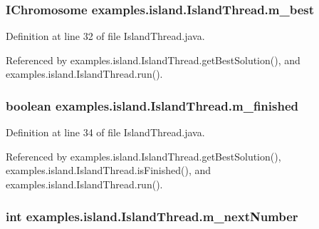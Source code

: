 \hypertarget{classexamples_1_1island_1_1_island_thread_a6bc44da1d0ca531ed0d04d6ccd7b2d6f}{
\subsubsection[{m\-\_\-best}]{\setlength{\rightskip}{0pt plus 5cm}I\-Chromosome examples.\-island.\-Island\-Thread.\-m\-\_\-best\hspace{0.3cm}{\ttfamily [private]}}}\label{classexamples_1_1island_1_1_island_thread_a6bc44da1d0ca531ed0d04d6ccd7b2d6f}


Definition at line 32 of file Island\-Thread.\-java.



Referenced by examples.\-island.\-Island\-Thread.\-get\-Best\-Solution(), and examples.\-island.\-Island\-Thread.\-run().

\hypertarget{classexamples_1_1island_1_1_island_thread_a5c59594d897f6d104fc638f4ee15d4c9}{
\subsubsection[{m\-\_\-finished}]{\setlength{\rightskip}{0pt plus 5cm}boolean examples.\-island.\-Island\-Thread.\-m\-\_\-finished\hspace{0.3cm}{\ttfamily [private]}}}\label{classexamples_1_1island_1_1_island_thread_a5c59594d897f6d104fc638f4ee15d4c9}


Definition at line 34 of file Island\-Thread.\-java.



Referenced by examples.\-island.\-Island\-Thread.\-get\-Best\-Solution(), examples.\-island.\-Island\-Thread.\-is\-Finished(), and examples.\-island.\-Island\-Thread.\-run().

\hypertarget{classexamples_1_1island_1_1_island_thread_a8ac5b56bd618165a1514440e39fe320a}{
\subsubsection[{m\-\_\-next\-Number}]{\setlength{\rightskip}{0pt plus 5cm}int examples.\-island.\-Island\-Thread.\-m\-\_\-next\-Number\hspace{0.3cm}{\ttfamily [private]}}}\label{classexamples_1_1island_1_1_island_thread_a8ac5b56bd618165a1514440e39fe320a}


